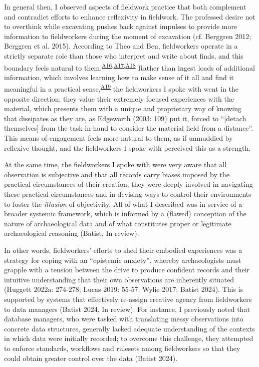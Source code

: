 \documentclass[
]{article}
\begin{document}
In general then, I observed aspects of fieldwork practice that both
complement and contradict efforts to enhance reflexivity in fieldwork.
The professed desire not to overthink while excavating pushes back
against impulses to provide more information to fieldworkers during the
moment of excavation (cf. Berggren 2012; Berggren et al. 2015).
According to Theo and Ben, fieldworkers operate in a strictly separate
role than those who interpret and write about finds, and this boundary
feels natural to
them.\textsuperscript{\hyperref[sec-A16]{A16},\hyperref[sec-A17]{A17},\hyperref[sec-A18]{A18}}
Rather than ingest loads of additional information, which involves
learning how to make sense of it all and find it meaningful in a
practical sense,\textsuperscript{\hyperref[sec-A19]{A19}} the
fieldworkers I spoke with went in the opposite direction; they value
their extremely focused experiences with the material, which presents
them with a unique and proprietary way of knowing that dissipates as
they are, as Edgeworth (2003: 109) put it, forced to ``{[}detach
themselves{]} from the task-in-hand to consider the material field from
a distance''. This means of engagement feels more natural to them, as if
unmuddied by reflexive thought, and the fieldworkers I spoke with
perceived this as a strength.

At the same time, the fieldworkers I spoke with were very aware that all
observation is subjective and that all records carry biases imposed by
the practical circumstances of their creation; they were deeply involved
in navigating these practical circumstances and in devising ways to
control their environments to foster the \emph{illusion} of objectivity.
All of what I described was in service of a broader systemic framework,
which is informed by a (flawed) conception of the nature of
archaeological data and of what constitutes proper or legitimate
archaeological reasoning (Batist, In review).

In other words, fieldworkers' efforts to shed their embodied experiences
was a strategy for coping with an ``epistemic anxiety'', whereby
archaeologists must grapple with a tension between the drive to produce
confident records and their intuitive understanding that their own
observations are inherently situated (Huggett 2022a: 274-278; Lucas
2019: 55-57; Wylie 2017; Batist 2024). This is supported by systems that
effectively re-assign creative agency from fieldworkers to data managers
(Batist 2024, In review). For instance, I previously noted that database
managers, who were tasked with translating messy observations into
concrete data structures, generally lacked adequate understanding of the
contexts in which data were initially recorded; to overcome this
challenge, they attempted to enforce standards, workflows and rulesets
among fieldworkers so that they could obtain greater control over the
data (Batist 2024).
\end{document}
